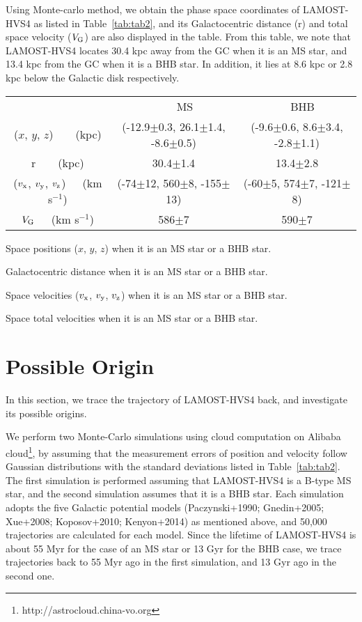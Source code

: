 \documentclass[iop, aj]{emulateapj}
\begin{document}
Using Monte-carlo method, we obtain the phase space coordinates of LAMOST-HVS4 as listed in Table~\ref{tab:tab2}, and its Galactocentric distance (r) and total space velocity ($V_{\rm G}$) are also displayed in the table. From this table, we note that LAMOST-HVS4 locates 30.4 kpc away from the GC when it is an MS star, and 13.4 kpc from the GC when it is a BHB star. In addition, it lies at 8.6 kpc or 2.8 kpc below the Galactic disk respectively.

\begin{table*}
\centering
\caption{Space positions and velocities. \label{tab:tab2}}
\begin{threeparttable}
\begin{tabular}{ccc}
\hline
 & ~~~~MS & ~~BHB \\
($x$, $y$, $z$)~\tnote{a}~~~(kpc) & (-12.9$\pm$0.3, 26.1$\pm$1.4, -8.6$\pm$0.5) & (-9.6$\pm$0.6, 8.6$\pm$3.4, -2.8$\pm$1.1)  \\
r~\tnote{b}~~~(kpc) & 30.4$\pm$1.4 & 13.4$\pm$2.8 \\
($v_{\rm x}$, $v_{\rm y}$, $v_{\rm z}$)\tnote{c}~~~(km s$^{-1}$) & (-74$\pm$12, 560$\pm$8, -155$\pm$13) & (-60$\pm$5, 574$\pm$7, -121$\pm$8)\\
$V_{\rm G}$\tnote{d}~~~(km s$^{-1}$) & 586$\pm$7 & 590$\pm$7 \\
\hline
\end{tabular}
\begin{tablenotes}
\item[a] Space positions ($x$, $y$, $z$) when it is an MS star or a BHB star.
\item[b] Galactocentric distance when it is an MS star or a BHB star.
\item[c] Space velocities ($v_{\rm x}$, $v_{\rm y}$, $v_{\rm z}$) when it is an MS star or a BHB star.
\item[d] Space total velocities when it is an MS star or a BHB star.
\end{tablenotes}
\end{threeparttable}
\end{table*}

\section{Possible Origin}

In this section, we trace the trajectory of LAMOST-HVS4 back, and investigate its possible origins.

We perform two Monte-Carlo simulations using cloud computation on Alibaba cloud\footnote{http://astrocloud.china-vo.org}, by assuming that the measurement errors of position and velocity follow Gaussian distributions with the standard deviations listed in Table~\ref{tab:tab2}. The first simulation is performed assuming that LAMOST-HVS4 is a B-type MS star, and the second simulation assumes that it is a BHB star. Each simulation adopts the five Galactic potential models (Paczynski+1990; Gnedin+2005; Xue+2008; Koposov+2010; Kenyon+2014) as mentioned above, and 50,000 trajectories are calculated for each model. Since the lifetime of LAMOST-HVS4 is about 55 Myr for the case of an MS star or 13 Gyr for the BHB case, we trace trajectories back to 55 Myr ago in the first simulation, and 13 Gyr ago in the second one.
\end{document}
